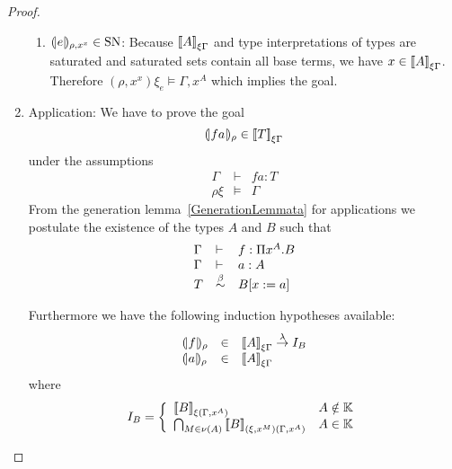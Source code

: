 \begin{theorem}
\begin{proof}
\begin{enumerate}
\begin{enumerate}
            \item ${(\!|e|\!)_{\rho,x^x}} \in \text{SN}$: Because
                ${{[\![} A{]\!]}}_{\xi\Gamma}$ and type interpretations of types are
                    saturated and saturated sets contain all base terms, we have
                    $x \in {{[\![}A{]\!]}}_{\xi\Gamma}$. Therefore $(\rho,x^x)\xi_e
                    \vDash \Gamma,x^A$ which implies the goal.
            \end{enumerate}


        \item Application: We have to prove the goal
            $$
            {(\!|f a|\!)_{\rho}} \in {{[\![}T{]\!]}}_{\xi\Gamma}
            $$
            under the assumptions
            $$
            \begin{array}{lll}
                \Gamma &\vdash& f a : T
                \\
                \rho\xi &\vDash& \Gamma
            \end{array}
            $$
            From the generation lemma~\ref{GenerationLemmata} for applications
            we postulate the existence of the types $A$ and $B$ such that
            $$
            \begin{array}{lll}
                \Gamma &\vdash& f : \Pi x^A.B
                \\
                \Gamma &\vdash& a : A
                \\
                T &\stackrel{\beta}{\sim}& B[x:=a]
            \end{array}
            $$

            Furthermore we have the following induction hypotheses available:
            $$
            \begin{array}{lll}
                \terminter{f}{\rho}
                &\in& \typeinter{A}{\xi\Gamma} \tolambda I_B
                \\
                \terminter{a}{\rho} &\in& \typeinter{A}{\xi\Gamma}
            \end{array}
            $$
            where
            $$
            I_B =
            \left\{
            \begin{array}{ll}
                {{[\![}B{]\!]}}_{\xi(\Gamma,x^A)}
                & A \notin \mathbb{K}
                \\
                \bigcap_{M \in \nu(A)}
                {{[\![} B{]\!]}}_{(\xi,x^M)(\Gamma,x^A)}
                & A \in \mathbb{K}
            \end{array}
            \right.
            $$


\end{enumerate}
\end{proof}
\end{theorem}
